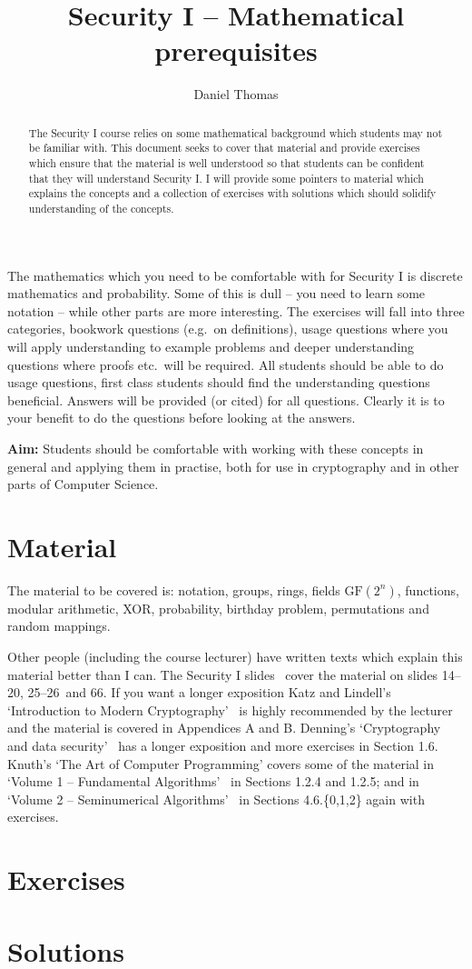 \documentclass[12pt,a4paper]{article}
\author{Daniel Thomas}
\title{Security I -- Mathematical prerequisites}
\newif\ifshowanswers
\newcommand{\slidesinitialmath}{14--20}
\newcommand{\slidesprobability}{25--26}
\newcommand{\slidesbirthday}{66}
\newcommand{\slidesall}{\slidesinitialmath, \slidesprobability\ and \slidesbirthday}
\begin{document}
\maketitle

\begin{abstract}
The Security I course relies on some mathematical background which students may not be familiar with.
This document seeks to cover that material and provide exercises which ensure that the material is well understood so that students can be confident that they will understand Security I.
I will provide some pointers to material which explains the concepts and a collection of exercises with solutions which should solidify understanding of the concepts.
\end{abstract}

The mathematics which you need to be comfortable with for Security I is discrete mathematics and probability.
Some of this is dull -- you need to learn some notation -- while other parts are more interesting.
The exercises will fall into three categories, bookwork questions (e.g.\ on definitions), usage questions where you will apply understanding to example problems and deeper understanding questions where proofs etc.\ will be required.
All students should be able to do usage questions, first class students should find the understanding questions beneficial.
Answers will be provided (or cited) for all questions.
Clearly it is to your benefit to do the questions before looking at the answers.

{\bf Aim:} Students should be comfortable with working with these concepts in general and applying them in practise, both for use in cryptography and in other parts of Computer Science.

\section*{Material}
The material to be covered is: notation, groups, rings, fields $\mathrm{GF}(2^n)$, functions, modular arithmetic, XOR, probability, birthday problem, permutations and random mappings.

Other people (including the course lecturer) have written texts which explain this material better than I can.
The Security I slides~\cite{SecurityISlides} cover the material on slides \slidesall.
If you want a longer exposition Katz and Lindell's `Introduction to Modern Cryptography'~\cite{Katz2008} is highly recommended by the lecturer and the material is covered in Appendices A and B.
Denning's `Cryptography and data security'~\cite{Denning1982} has a longer exposition and more exercises in Section 1.6.
Knuth's `The Art of Computer Programming' covers some of the material in `Volume 1 -- Fundamental Algorithms'~\cite{KnuthTAOCP1} in Sections 1.2.4 and 1.2.5; and in `Volume 2 -- Seminumerical Algorithms'~\cite{KnuthTAOCP2} in Sections 4.6.\{0,1,2\} again with exercises.

\section*{Exercises}
\showanswersfalse


\twocolumn
\section*{Solutions}
\showanswerstrue


\onecolumn

\printbibliography
\end{document}
